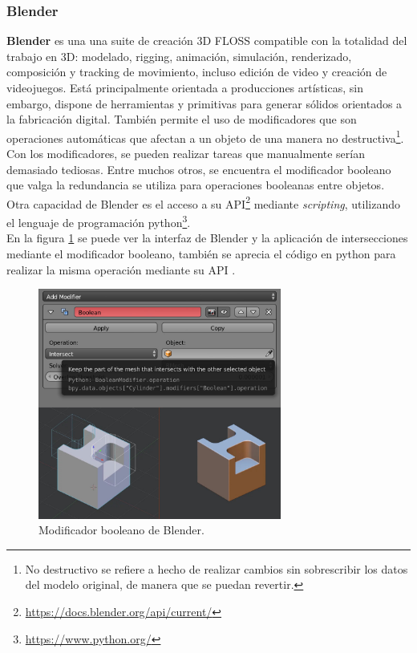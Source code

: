 \subsubsection{Blender} 
\textbf{\Gls{Blender}} \citep{BlenderFoundation} es una una suite de creación 3D FLOSS compatible con la totalidad del trabajo en 3D: modelado, rigging, animación, simulación, renderizado, composición y tracking de movimiento, incluso edición de video y creación de videojuegos. Está principalmente orientada a producciones artísticas, sin embargo, dispone de herramientas y primitivas para generar sólidos orientados a la fabricación digital. También permite el uso de modificadores que son operaciones automáticas que afectan a un objeto de una manera no destructiva\footnote{ No destructivo se refiere a hecho de realizar cambios sin sobrescribir los datos del modelo original, de manera que se puedan revertir.}. Con los modificadores, se pueden realizar tareas que manualmente serían demasiado tediosas. Entre muchos otros, se encuentra el modificador booleano que valga la redundancia se utiliza para  operaciones booleanas entre objetos. Otra capacidad de  Blender es el acceso a su \Gls{API}\footnote{\url{https://docs.blender.org/api/current/}} mediante \textit{scripting}, utilizando el lenguaje de programación python\footnote{\url{https://www.python.org/}}.\\
En la figura \ref{fig:blenda} se puede ver la interfaz de Blender y la aplicación de intersecciones mediante el modificador booleano, también se aprecia el código en python para realizar la misma operación mediante su API \citep{blenderBoolean}.


\begin{figure}[h]
\includegraphics[width=8cm]{Img/Modelos/modelado22.jpg}
\centering
\caption{\footnotesize{Modificador booleano de Blender}. }
\label{fig:blenda}
\end{figure}


